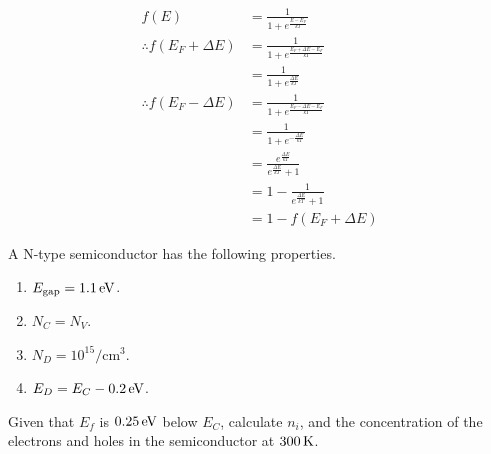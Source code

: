\documentclass[fleqn, a4paper, 11pt, oneside]{amsart}
\theoremstyle{definition}
\theoremstyle{theorem}
\begin{document}
\begin{solution}
\begin{enumerate}[leftmargin=*]
\begin{align*}
				f(E)                         & = \frac{1}{1 + e^{\frac{E - E_F}{k T}}}                         \\
				\therefore f(E_F + \Delta E) & = \frac{1}{1 + e^{\frac{E_F + \Delta E - E_F}{k T}}}            \\
                                                             & = \frac{1}{1 + e^{\frac{\Delta E}{k T}}}                        \\
				\therefore f(E_F - \Delta E) & = \frac{1}{1 + e^{\frac{E_F - \Delta E - E_F}{k T}}}            \\
                                                             & = \frac{1}{1 + e^{-\frac{\Delta E}{k T}}}                       \\
                                                             & = \frac{e^{\frac{\Delta E}{k T}}}{e^{\frac{\Delta E}{k T}} + 1} \\
                                                             & = 1 - \frac{1}{e^{\frac{\Delta E}{k T}} + 1}                    \\
                                                             & = 1 - f(E_F + \Delta E)
			\end{align*}
	\end{enumerate}
\end{solution}

\begin{question}
	A N-type semiconductor has the following properties.
	\begin{enumerate}
		\item $E_{\text{gap}} = 1.1 \electronvolt$.
		\item $N_C = N_V$.
		\item $N_D = 10^{15} \si{\per\centi\metre\cubed}$.
		\item $E_D = E_C - 0.2 \electronvolt$.
	\end{enumerate}
	Given that $E_f$ is $0.25 \electronvolt$ below $E_C$, calculate $n_i$, and the concentration of the electrons and holes in the semiconductor at $300 \kelvin$.
\end{question}
\end{document}
